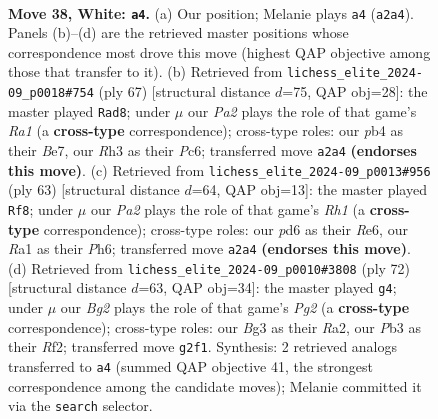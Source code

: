 \documentclass[11pt]{article}
\begin{document}
\clearpage

\begin{figure}[p]\centering
\begin{subfigure}{0.46\textwidth}\centering
\resizebox{\linewidth}{!}{%
\newchessgame
\chessboard[
  setfen={r5r1/1n3kbp/p2p2p1/4p1P1/1p2P2P/1P3PBR/P1PK2B1/R7 w - - 5 38},
  showmover=false,
  pgfstyle=straightmove, color=movearrow, markmove={a2-a4}
]}
\caption{}
\end{subfigure}\hfill
\begin{subfigure}{0.46\textwidth}\centering
\resizebox{\linewidth}{!}{%
\newchessgame
\chessboard[
  setfen={r7/p3b1k1/2p1Pp2/2pr1Ppp/2Np4/P5PP/1P1BK3/5R2 b - - 4 34},
  showmover=false,
  pgfstyle=straightmove, color=movearrow, markmove={a8-d8}
]}
\caption{}
\end{subfigure}
\\[4pt]
\begin{subfigure}{0.46\textwidth}\centering
\resizebox{\linewidth}{!}{%
\newchessgame
\chessboard[
  setfen={2k4r/2p5/1p1prp1p/p3p3/P1P1P1b1/2PP2P1/3K1R1P/5RN1 b - - 7 32},
  showmover=false,
  pgfstyle=straightmove, color=movearrow, markmove={h8-f8}
]}
\caption{}
\end{subfigure}\hfill
\begin{subfigure}{0.46\textwidth}\centering
\resizebox{\linewidth}{!}{%
\newchessgame
\chessboard[
  setfen={1r6/3bkpp1/1r1p4/2pBpPp1/p3P3/2PP3P/RP3RPK/8 w - - 0 37},
  showmover=false,
  pgfstyle=straightmove, color=movearrow, markmove={g2-g4}
]}
\caption{}
\end{subfigure}
\caption{\textbf{Move 38, White: \texttt{a4}.} (a) Our position; Melanie plays \texttt{a4} (\texttt{a2a4}). Panels (b)--(d) are the retrieved master positions whose correspondence most drove this move (highest QAP objective among those that transfer to it). (b) Retrieved from \texttt{lichess\_elite\_2024-09\_p0018\#754} (ply 67) [structural distance $d$=75, QAP obj=28]: the master played \texttt{Rad8}; under $\mu$ our \emph{Pa2} plays the role of that game's \emph{Ra1} (a \textbf{cross-type} correspondence); cross-type roles: our \emph{p}b4 as their \emph{B}e7, our \emph{R}h3 as their \emph{P}c6; transferred move \texttt{a2a4} \textbf{(endorses this move)}. (c) Retrieved from \texttt{lichess\_elite\_2024-09\_p0013\#956} (ply 63) [structural distance $d$=64, QAP obj=13]: the master played \texttt{Rf8}; under $\mu$ our \emph{Pa2} plays the role of that game's \emph{Rh1} (a \textbf{cross-type} correspondence); cross-type roles: our \emph{p}d6 as their \emph{R}e6, our \emph{R}a1 as their \emph{P}h6; transferred move \texttt{a2a4} \textbf{(endorses this move)}. (d) Retrieved from \texttt{lichess\_elite\_2024-09\_p0010\#3808} (ply 72) [structural distance $d$=63, QAP obj=34]: the master played \texttt{g4}; under $\mu$ our \emph{Bg2} plays the role of that game's \emph{Pg2} (a \textbf{cross-type} correspondence); cross-type roles: our \emph{B}g3 as their \emph{R}a2, our \emph{P}b3 as their \emph{R}f2; transferred move \texttt{g2f1}. Synthesis: 2 retrieved analogs transferred to \texttt{a4} (summed QAP objective 41, the strongest correspondence among the candidate moves); Melanie committed it via the \texttt{search} selector.}
\label{fig:thought-m74}
\end{figure}
\end{document}
